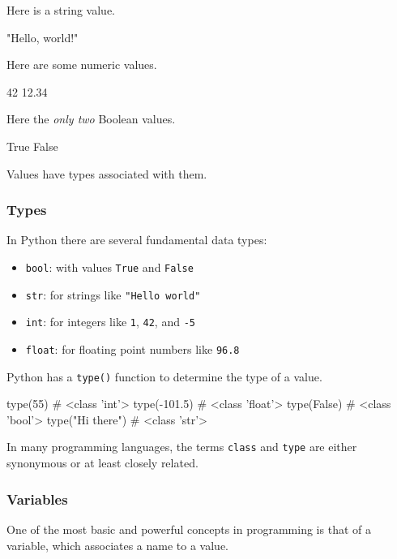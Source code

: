 \documentclass[12pt,letterpaper,twoside]{article}
\begin{document}
Here is a string value.

\begin{python}
"Hello, world!"
\end{python}

Here are some numeric values.

\begin{python}
42
12.34
\end{python}

Here the \emph{only two} Boolean values.
\begin{python}
True
False
\end{python}

Values have types associated with them.

\subsubsection{Types}

In Python there are several fundamental data types:

\begin{itemize}
\item
  \texttt{bool}: with values \texttt{True} and \texttt{False}
\item
  \texttt{str}: for strings like \texttt{"Hello\ world"}
\item
  \texttt{int}: for integers like \texttt{1}, \texttt{42}, and
  \texttt{-5}
\item
  \texttt{float}: for floating point numbers like \texttt{96.8}
\end{itemize}

Python has a \texttt{type()} function to determine the type of a value.

\begin{python}
  type(55)               # <class 'int'>
  type(-101.5)           # <class 'float'>
  type(False)            # <class 'bool'>
  type("Hi there")       # <class 'str'>
\end{python}

In many programming languages, the terms \texttt{class} and \texttt{type}
are either synonymous or at least closely related.

\subsubsection{Variables}

One of the most basic and powerful concepts in programming is that of
  a variable, which associates a name to a value.
\end{document}
